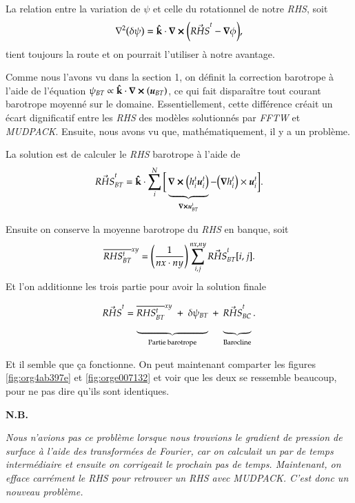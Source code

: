 \documentclass[10pt]{article}
\numberwithin{equation}{section}
\newcommand{\kvf}{\vb{\hat{k}}}
\newcommand{\uu}{\vb*{u}}
\newcommand{\grande}{\vphantom{\frac{1}{xx}}}
\newcommand{\venti}{\vphantom{\sum_x^x}}
\newcommand{\xymean}[1]{\overline{#1}^{xy}}
\newcommand{\nb}{\textbf{N.B.}\hspace{4pt}}
\begin{document}
La relation entre la variation de \(\psi\) et celle du rotationnel de notre \emph{RHS}, soit
\begin{equation}
   \laplacian(\delta \psi) = \kvf\cdot\curl(\vec{RHS}^t - \gradient{\phi}),
\end{equation}
tient toujours la route et on pourrait l'utiliser à notre avantage.\bigskip

Comme nous l'avons vu dans la section 1, on définit la correction barotrope à l'aide de l'équation \(\psi_{BT} \propto \kvf\cdot\curl(\uu_{BT})\), ce qui fait disparaître tout courant barotrope moyenné sur le domaine.
Essentiellement, cette différence créait un écart dignificatif entre les \emph{RHS} des modèles solutionnés par \emph{FFTW} et \emph{MUDPACK}.
Ensuite, nous avons vu que, mathématiquement, il y a un problème.\bigskip

La solution est de calculer le \emph{RHS} barotrope à l'aide de
\begin{equation}
   \vec{RHS}^t_{BT} = \kvf\cdot \sum_i^N \bigg[ \underbrace{\grande\curl(h^t_i \uu^t_i)}_{\curl{\uu^t_{BT}}}  - \qty(\gradient{h^t_i})\times\uu^t_i\bigg].
\end{equation}

Ensuite on conserve la moyenne barotrope du \emph{RHS} en banque, soit
\begin{equation}
   \xymean{RHS^t_{BT}} = \qty(\frac{1}{nx\cdot ny})\sum_{i,j}^{nx,ny} \vec{RHS}^t_{BT}[i,j].
\end{equation}
Et l'on additionne les trois partie pour avoir la solution finale
\begin{equation}
   \vec{RHS}^t = \underbrace{\venti\xymean{RHS^t_{BT}} \ + \ \delta \psi_{BT}}_\text{Partie barotrope}\ + \ \underbrace{\venti\vec{RHS}^t_{BC}}_\text{Barocline}.
\end{equation}

Et il semble que ça fonctionne.
On peut maintenant comparter les figures \ref{fig:org4ab397e} et \ref{fig:orge007132} et voir que les deux se ressemble beaucoup, pour ne pas dire qu'ils sont identiques. \bigskip

\nb\begin{minipage}[t]{0.9\linewidth}
\itshape Nous n'avions pas ce problème lorsque nous trouvions le gradient de pression de surface à l'aide des transformées de Fourier, car on calculait un par de temps intermédiaire et ensuite on corrigeait le prochain pas de temps. Maintenant, on efface carrément le RHS pour retrouver un RHS avec MUDPACK. C'est donc un nouveau problème.
\end{minipage}
\end{document}
